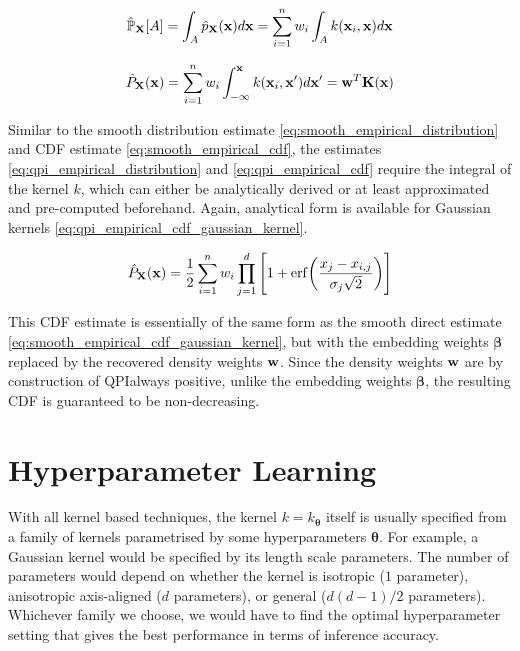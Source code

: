 \documentclass[twoside]{article} \usepackage{aistats2017}
\theoremstyle{definition}
\theoremstyle{theorem}
\newcommand{\rv}[1]{{#1}}
\newcommand{\qpi}{QPI}
\begin{document}
	\begin{equation}
		\hat{\mathbb{P}}_{\bvec{\rv{X}}}[A] = \int_{A} \hat{p}_{\bvec{\rv{X}}}(\bvec{x}) d\bvec{x} = \sum_{i = 1}^{n} w_{i} \int_{A} k(\bvec{x}_{i}, \bvec{x}) d\bvec{x}
	\label{eq:qpi_empirical_distribution}
	\end{equation}
	
	\begin{equation}
		\hat{P}_{\bvec{\rv{X}}}(\bvec{x}) = \sum_{i = 1}^{n} w_{i} \int_{-\bvec{\infty}}^{\bvec{x}} k(\bvec{x}_{i}, \bvec{x}') d\bvec{x}' =  \bvec{w}^{T} \bvec{K}(\bvec{x})
	\label{eq:qpi_empirical_cdf}
	\end{equation}
	
	Similar to the smooth distribution estimate \eqref{eq:smooth_empirical_distribution} and CDF estimate \eqref{eq:smooth_empirical_cdf}, the estimates \eqref{eq:qpi_empirical_distribution} and \eqref{eq:qpi_empirical_cdf} require the integral of the kernel $k$, which can either be analytically derived or at least approximated and pre-computed beforehand. Again, analytical form is available for Gaussian kernels \eqref{eq:qpi_empirical_cdf_gaussian_kernel}.
	
	\begin{equation}
		\hat{P}_{\bvec{\rv{X}}}(\bvec{x}) = \frac{1}{2} \sum_{i = 1}^{n} w_{i} \prod_{j = 1}^{d} \Bigg[1 + \mathrm{erf}\bigg(\frac{x_{j} - x_{i, j}}{\sigma_{j} \sqrt{2}}\bigg)\Bigg]
	\label{eq:qpi_empirical_cdf_gaussian_kernel}
	\end{equation}
	
	This CDF estimate is essentially of the same form as the smooth direct estimate \eqref{eq:smooth_empirical_cdf_gaussian_kernel}, but with the embedding weights $\bm{\beta}$ replaced by the recovered density weights $\mathbf{w}$. Since the density weights $\mathbf{w}$ are by construction of \qpi\space always positive, unlike the embedding weights $\bm{\beta}$, the resulting CDF is guaranteed to be non-decreasing.
 
\section{Hyperparameter Learning}
\label{sec:hyperparameter_learning}

	With all kernel based techniques, the kernel $k = k_{\bm{\theta}}$ itself is usually specified from a family of kernels parametrised by some hyperparameters $\bm{\theta}$. For example, a Gaussian kernel would be specified by its length scale parameters. The number of parameters would depend on whether the kernel is isotropic ($1$ parameter), anisotropic axis-aligned ($d$ parameters), or general ($d(d - 1)/2$ parameters). Whichever family we choose, we would have to find the optimal hyperparameter setting that gives the best performance in terms of inference accuracy.
	
\end{document}
